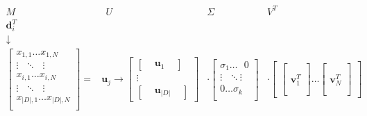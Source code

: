 $$
\begin{matrix} 
 M &  ~~ U & \Sigma & V^T \\
 \textbf{d}_i^T &  & &  \\
 \downarrow &  & &  \\
\begin{bmatrix}
x_{1,1} \dots  x_{1,N} \\
\vdots ~~~  \ddots ~~~ \vdots \\
x_{i,1} \dots  x_{i,N} \\
\vdots ~~~ \ddots ~~~ \vdots \\
x_{|D|,1} \dots  x_{|D|,N} \\
\end{bmatrix}
=
&
\textbf{u}_j \rightarrow
\begin{bmatrix} 
\begin{bmatrix} & \textbf{u}_1 & \end{bmatrix} \\
\vdots \\
\begin{bmatrix} & \textbf{u}_{|D|} & \end{bmatrix}
\end{bmatrix}
&
\cdot
\begin{bmatrix} 
\sigma_1 \dots ~~~ 0 \\
\vdots ~~~ \ddots  \vdots \\
0  \dots  \sigma_k \\
\end{bmatrix}
&
\cdot
\begin{bmatrix} 
\begin{bmatrix} \, \\ \, \\ \textbf{v}_1^T \\ \, \\ \,\end{bmatrix} 
\dots
\begin{bmatrix} \, \\ \, \\ \textbf{v}_N^T \\ \, \\ \, \end{bmatrix}
\end{bmatrix}
\end{matrix}
$$
